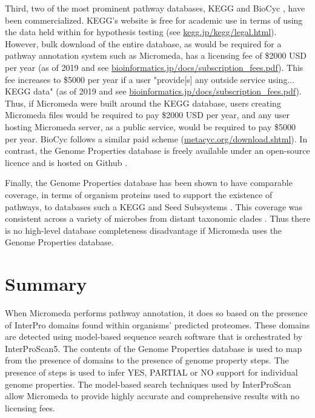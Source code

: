 Third, two of the most prominent pathway databases, KEGG and BioCyc \cite{karp2005expansion}, have been commercialized. KEGG's website is free for academic use in terms of using the data held within for hypothesis testing (see \href{www.kegg.jp/kegg/legal.html}{kegg.jp/kegg/legal.html}). However, bulk download of the entire database, as would be required for a pathway annotation system such as Micromeda, has a licensing fee of \$2000 USD per year (as of 2019 and see \href{bioinformatics.jp/docs/subscription\_fees.pdf}{bioinformatics.jp/docs/subscription\_fees.pdf}). This fee increases to \$5000 per year if a user "provide[s] any outside service using... KEGG data" (as of 2019 and see \href{bioinformatics.jp/docs/subscription\_fees.pdf}{bioinformatics.jp/docs/subscription\_fees.pdf}). Thus, if Micromeda were built around the KEGG database, users creating Micromeda files would be required to pay \$2000 USD per year, and any user hosting Micromeda server, as a public service, would be required to pay \$5000 per year. BioCyc follows a similar paid scheme (\href{metacyc.org/download.shtml}{metacyc.org/download.shtml}). In contrast, the Genome Properties database is freely available under an open-source licence and is hosted on Github \cite{richardson2018genome}.

Finally, the Genome Properties database has been shown to have comparable coverage, in terms of organism proteins used to support the existence of pathways, to databases such a KEGG and Seed Subsystems \cite{richardson2018genome}. This coverage was consistent across a variety of microbes from distant taxonomic clades \cite{richardson2018genome}. Thus there is no high-level database completeness disadvantage if Micromeda uses the Genome Properties database. 

\section{Summary}

When Micromeda performs pathway annotation, it does so based on the presence of InterPro domains found within organisms' predicted proteomes. These domains are detected using model-based sequence search software that is orchestrated by InterProScan5. The contents of the Genome Properties database is used to map from the presence of domains to the presence of genome property steps. The presence of steps is used to infer YES, PARTIAL or NO support for individual genome properties. The model-based search techniques used by InterProScan allow Micromeda to provide highly accurate and comprehensive results with no licensing fees.
